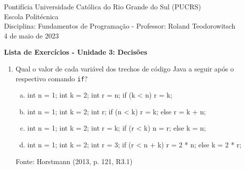 \documentclass[onecolumn,a4paper,10pt]{report}
\newcommand{\+}{\, + \,}
\newcommand{\<}{\hspace*{-0.4cm}}
\begin{document}
\singlespacing

\begin{center}
Pontifícia Universidade Católica do Rio Grande do Sul (PUCRS)\\
Escola Politécnica\\
Disciplina: Fundamentos de Programação - Professor: Roland Teodorowitsch\\
4 de maio de 2023
\end{center}

\begin{center}
\textbf{Lista de Exercícios - Unidade 3: Decisões}
\end{center}

\begin{enumerate}[1.]

\item Qual o valor de cada variável dos trechos de código Java a seguir após o respectivo comando \texttt{if}?
\begin{enumerate}[a)]
\item
\begin{javacode}
int n = 1; int k = 2; int r = n;
if (k < n) { r = k; }
\end{javacode}
\item
\begin{javacode}
int n = 1; int k = 2; int r;
if (n < k) { r = k; }
else { r = k + n; }
\end{javacode}
\item
\begin{javacode}
int n = 1; int k = 2; int r = k;
if (r < k) { n = r; }
else { k = n; }
\end{javacode}
\item
\begin{javacode}
int n = 1; int k = 2; int r = 3;
if (r < n + k) { r = 2 * n; }
else { k = 2 * r; }
\end{javacode}
\end{enumerate}
{\tiny Fonte: Horstmann (2013, p. 121, R3.1)}


\end{enumerate}
\end{document}

